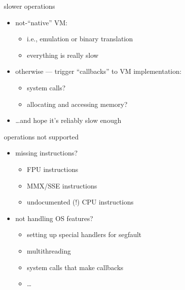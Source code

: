 
\begin{frame}{slower operations}
    \begin{itemize}
    \item not-``native'' VM:
        \begin{itemize}
        \item i.e., emulation or binary translation
        \item everything is really slow
        \end{itemize}
    \item otherwise --- trigger ``callbacks'' to VM implementation:
        \begin{itemize}
        \item system calls?
        \item allocating and accessing memory?
        \end{itemize}
    \item \ldots and hope it's reliably slow enough
    \end{itemize}
\end{frame}



\begin{frame}{operations not supported}
    \begin{itemize}
    \item missing instructions?
        \begin{itemize}
        \item FPU instructions
        \item MMX/SSE instructions
        \item undocumented (!) CPU instructions
        \end{itemize}
    \item not handling OS features?
        \begin{itemize}
        \item setting up special handlers for segfault
        \item multithreading
        \item system calls that make callbacks
        \item \ldots
        \end{itemize}
    \end{itemize}
\end{frame}

